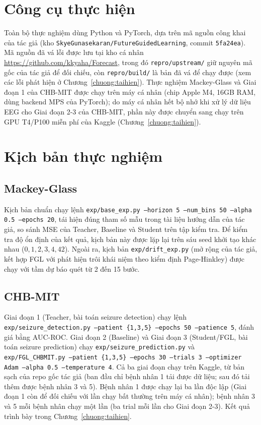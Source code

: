 \section{Công cụ thực hiện}

Toàn bộ thực nghiệm dùng Python và PyTorch, dựa trên mã nguồn công khai của tác giả (kho
\texttt{SkyeGunasekaran/FutureGuidedLearning}, commit \texttt{5fa24ea}). Mã nguồn đã vá lỗi
được lưu tại kho cá nhân \url{https://github.com/kkyaha/Forecast}, trong đó
\texttt{repro/upstream/} giữ nguyên mã gốc của tác giả để đối chiếu, còn \texttt{repro/build/}
là bản đã vá để chạy được (xem các lỗi phát hiện ở Chương~\ref{chuong:taihien}). Thực nghiệm
Mackey-Glass và Giai đoạn 1 của CHB-MIT được chạy trên máy cá nhân (chip Apple M4, 16GB RAM,
dùng backend MPS của PyTorch); do máy cá nhân hết bộ nhớ khi xử lý dữ liệu EEG cho Giai đoạn
2-3 của CHB-MIT, phần này được chuyển sang chạy trên GPU T4/P100 miễn phí của Kaggle
(Chương~\ref{chuong:taihien}).

\section{Kịch bản thực nghiệm}

\subsection{Mackey-Glass}

Kịch bản chuẩn chạy lệnh
\texttt{exp/base\_exp.py --horizon 5 --num\_bins 50 --alpha 0.5 --epochs 20}, tái hiện đúng
tham số mẫu trong tài liệu hướng dẫn của tác giả, so sánh MSE của Teacher, Baseline và Student
trên tập kiểm tra. Để kiểm tra độ ổn định của kết quả, kịch bản này được lặp lại trên sáu seed
khởi tạo khác nhau ($0, 1, 2, 3, 4, 42$). Ngoài ra, kịch bản \texttt{exp/drift\_exp.py} (mở
rộng của tác giả, kết hợp FGL với phát hiện trôi khái niệm theo kiểm định Page-Hinkley) được
chạy với tầm dự báo quét từ 2 đến 15 bước.

\subsection{CHB-MIT}

Giai đoạn 1 (Teacher, bài toán seizure detection) chạy lệnh
\texttt{exp/seizure\_detection.py --patient \{1,3,5\} --epochs 50 --patience 5}, đánh giá bằng
AUC-ROC. Giai đoạn 2 (Baseline) và Giai đoạn 3 (Student/FGL, bài toán seizure prediction) chạy
\texttt{exp/seizure\_prediction.py} và \texttt{exp/FGL\_CHBMIT.py --patient \{1,3,5\} --epochs
30 --trials 3 --optimizer Adam --alpha 0.5 --temperature 4}. Cả ba giai đoạn chạy trên Kaggle,
từ bản sạch của repo gốc tác giả (ban đầu chỉ bệnh nhân 1 tải được dữ liệu; sau đó tải thêm
được bệnh nhân 3 và 5). Bệnh nhân 1 được chạy lại ba lần độc lập (Giai đoạn 1 còn để đối chiếu
với lần chạy bất thường trên máy cá nhân); bệnh nhân 3 và 5 mỗi bệnh nhân chạy một lần (ba
trial mỗi lần cho Giai đoạn 2-3). Kết quả trình bày trong Chương~\ref{chuong:taihien}.

